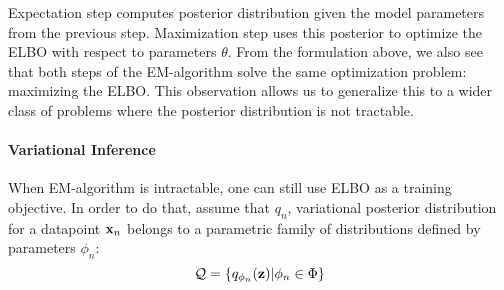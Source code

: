 Expectation step computes posterior distribution given the model parameters from the previous step. Maximization step uses this posterior to optimize the ELBO with respect to parameters $\theta$. From the formulation above, we also see that both steps of the EM-algorithm solve the same optimization problem: maximizing the ELBO.  This observation allows us to generalize this to a wider class of problems where the posterior distribution is not tractable. 

\paragraph{Variational Inference}
When EM-algorithm is intractable, one can still use ELBO as a training objective. 
In order to do that, assume that $q_n$,  variational posterior distribution for a datapoint ${\mathbf{x}}_n$ belongs to a parametric family of distributions defined by parameters $\phi_n$:
\begin{equation}
    \mathcal{Q} = \{q_{\phi_n}({\mathbf{z}}) | \phi_n \in \Phi\}
\end{equation}

